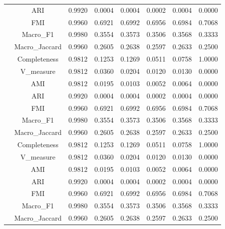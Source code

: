\begin{table}[ht!]
\begin{tabular*}{\linewidth}{@{} lc c c c c c c @{}}
 & ARI  & 0.9920 & 0.0004 & 0.0004 & 0.0002 & 0.0004 & 0.0000 \\

 & FMI  & 0.9960 & 0.6921 & 0.6992 & 0.6956 & 0.6984 & 0.7068 \\

 & Macro_F1  & 0.9980 & 0.3554 & 0.3573 & 0.3506 & 0.3568 & 0.3333 \\

 & Macro_Jaccard  & 0.9960 & 0.2605 & 0.2638 & 0.2597 & 0.2633 & 0.2500 \\

 & Completeness  & 0.9812 & 0.1253 & 0.1269 & 0.0511 & 0.0758 & 1.0000 \\

 & V_measure  & 0.9812 & 0.0360 & 0.0204 & 0.0120 & 0.0130 & 0.0000 \\
\addlinespace
\multirow{7}{*}{IZGC}
 & AMI  & 0.9812 & 0.0195 & 0.0103 & 0.0052 & 0.0064 & 0.0000 \\

 & ARI  & 0.9920 & 0.0004 & 0.0004 & 0.0002 & 0.0004 & 0.0000 \\

 & FMI  & 0.9960 & 0.6921 & 0.6992 & 0.6956 & 0.6984 & 0.7068 \\

 & Macro_F1  & 0.9980 & 0.3554 & 0.3573 & 0.3506 & 0.3568 & 0.3333 \\

 & Macro_Jaccard  & 0.9960 & 0.2605 & 0.2638 & 0.2597 & 0.2633 & 0.2500 \\

 & Completeness  & 0.9812 & 0.1253 & 0.1269 & 0.0511 & 0.0758 & 1.0000 \\

 & V_measure  & 0.9812 & 0.0360 & 0.0204 & 0.0120 & 0.0130 & 0.0000 \\
\addlinespace
\multirow{7}{*}{IZGC}
 & AMI  & 0.9812 & 0.0195 & 0.0103 & 0.0052 & 0.0064 & 0.0000 \\

 & ARI  & 0.9920 & 0.0004 & 0.0004 & 0.0002 & 0.0004 & 0.0000 \\

 & FMI  & 0.9960 & 0.6921 & 0.6992 & 0.6956 & 0.6984 & 0.7068 \\

 & Macro_F1  & 0.9980 & 0.3554 & 0.3573 & 0.3506 & 0.3568 & 0.3333 \\

 & Macro_Jaccard  & 0.9960 & 0.2605 & 0.2638 & 0.2597 & 0.2633 & 0.2500 \\


\end{tabular*}
\end{table}
